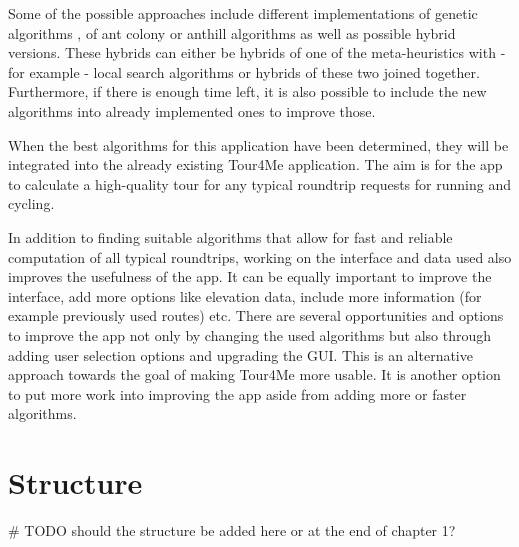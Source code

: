 Some of the possible approaches include different implementations of genetic algorithms \cite{gendreau_handbook_2010}, of ant colony or anthill algorithms \cite{gendreau_handbook_2010, babaoglu_anthill_2002, wang_application_2014} as well as possible hybrid versions.
These hybrids can either be hybrids of one of the meta-heuristics with - for example - local search algorithms \cite{gendreau_handbook_2010, wang_application_2014} or hybrids of these two joined together.
Furthermore, if there is enough time left, it is also possible to include the new algorithms into already implemented ones to improve those.

When the best algorithms for this application have been determined, they will be integrated into the already existing Tour4Me application. The aim is for the app to calculate a high-quality tour for any typical roundtrip requests for running and cycling.

In addition to finding suitable algorithms that allow for fast and reliable computation of all typical roundtrips, working on the interface and data used also improves the usefulness of the app.
It can be equally important to improve the interface, add more options like elevation data, include more information (for example previously used routes) etc. 
There are several opportunities and options to improve the app not only by changing the used algorithms but also through adding user selection options and upgrading the GUI.
This is an alternative approach towards the goal of making Tour4Me more usable.
It is another option to put more work into improving the app aside from adding more or faster algorithms.



\section{Structure}
\label{sec:structure}

\# TODO should the structure be added here or at the end of chapter 1? 
